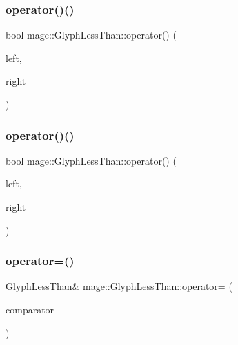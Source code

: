 \hypertarget{structmage_1_1_glyph_less_than_a263e9b07d9a3d84173739971abc5e217}{}\label{structmage_1_1_glyph_less_than_a263e9b07d9a3d84173739971abc5e217} 
\subsubsection{\texorpdfstring{operator()()}{operator()()}\hspace{0.1cm}{\footnotesize\ttfamily [2/3]}}
{\footnotesize\ttfamily bool mage\+::\+Glyph\+Less\+Than\+::operator() (\begin{DoxyParamCaption}\item[{const \hyperlink{structmage_1_1_glyph}{Glyph} \&}]{left,  }\item[{wchar\+\_\+t}]{right }\end{DoxyParamCaption})}

\hypertarget{structmage_1_1_glyph_less_than_a1ab127f38f1043b2361dcf73c3510dfd}{}\label{structmage_1_1_glyph_less_than_a1ab127f38f1043b2361dcf73c3510dfd} 
\subsubsection{\texorpdfstring{operator()()}{operator()()}\hspace{0.1cm}{\footnotesize\ttfamily [3/3]}}
{\footnotesize\ttfamily bool mage\+::\+Glyph\+Less\+Than\+::operator() (\begin{DoxyParamCaption}\item[{wchar\+\_\+t}]{left,  }\item[{const \hyperlink{structmage_1_1_glyph}{Glyph} \&}]{right }\end{DoxyParamCaption})}

\hypertarget{structmage_1_1_glyph_less_than_aa3de6a126c3a70ad452a17b37709eca6}{}\label{structmage_1_1_glyph_less_than_aa3de6a126c3a70ad452a17b37709eca6} 
\subsubsection{\texorpdfstring{operator=()}{operator=()}\hspace{0.1cm}{\footnotesize\ttfamily [1/2]}}
{\footnotesize\ttfamily \hyperlink{structmage_1_1_glyph_less_than}{Glyph\+Less\+Than}\& mage\+::\+Glyph\+Less\+Than\+::operator= (\begin{DoxyParamCaption}\item[{const \hyperlink{structmage_1_1_glyph_less_than}{Glyph\+Less\+Than} \&}]{comparator }\end{DoxyParamCaption})\hspace{0.3cm}{\ttfamily [default]}}

